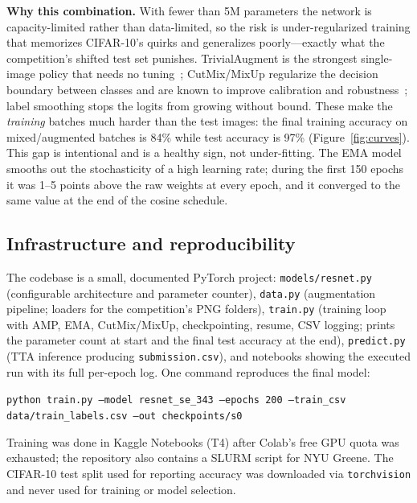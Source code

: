 \documentclass[11pt]{article}
\begin{document}
\textbf{Why this combination.} With fewer than 5M parameters the network is capacity-limited rather than data-limited, so the risk is under-regularized training that memorizes CIFAR-10's quirks and generalizes poorly---exactly what the competition's shifted test set punishes. TrivialAugment is the strongest single-image policy that needs no tuning~\cite{muller2021}; CutMix/MixUp regularize the decision boundary between classes and are known to improve calibration and robustness~\cite{yun2019}; label smoothing stops the logits from growing without bound. These make the \emph{training} batches much harder than the test images: the final training accuracy on mixed/augmented batches is 84\% while test accuracy is 97\% (Figure~\ref{fig:curves}). This gap is intentional and is a healthy sign, not under-fitting. The EMA model smooths out the stochasticity of a high learning rate; during the first 150 epochs it was 1--5 points above the raw weights at every epoch, and it converged to the same value at the end of the cosine schedule.

\subsection{Infrastructure and reproducibility}
The codebase is a small, documented PyTorch project: \texttt{models/resnet.py} (configurable architecture and parameter counter), \texttt{data.py} (augmentation pipeline; loaders for the competition's PNG folders), \texttt{train.py} (training loop with AMP, EMA, CutMix/MixUp, checkpointing, resume, CSV logging; prints the parameter count at start and the final test accuracy at the end), \texttt{predict.py} (TTA inference producing \texttt{submission.csv}), and notebooks showing the executed run with its full per-epoch log. One command reproduces the final model:
\begin{center}\footnotesize
\texttt{python train.py --model resnet\_se\_343 --epochs 200 --train\_csv data/train\_labels.csv --out checkpoints/s0}
\end{center}
Training was done in Kaggle Notebooks (T4) after Colab's free GPU quota was exhausted; the repository also contains a SLURM script for NYU Greene. The CIFAR-10 test split used for reporting accuracy was downloaded via \texttt{torchvision} and never used for training or model selection.
\end{document}
